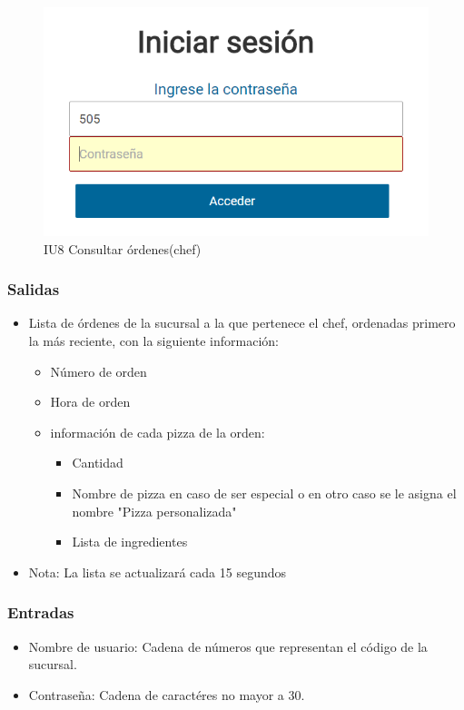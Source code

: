 \documentclass[oneside,10pt]{book}
\begin{document}
\begin{figure}[htbp!]
	\centering
	\includegraphics[width=1\textwidth]{img/iniciar_sesion2c}
	\caption{IU8 Consultar órdenes(chef)}
\end{figure}


\subsubsection{Salidas}
\begin{itemize} 
	\item Lista de órdenes de la sucursal a la que pertenece el chef, ordenadas primero la más reciente, con la siguiente información:
	\begin{itemize}
		\item Número de orden
		\item Hora de orden
		\item información de cada pizza de la orden:
		\begin{itemize}
			\item Cantidad
			\item Nombre de pizza en caso de ser especial o en otro caso se le asigna el nombre "Pizza personalizada"
			\item Lista de ingredientes
		\end{itemize}
	\end{itemize}
	\item Nota: La lista se actualizará cada 15 segundos
\end{itemize}
\subsubsection{Entradas}
\begin{itemize}
	\item Nombre de usuario: Cadena de números que representan el código de la sucursal. 
	\item Contraseña: Cadena de caractéres no mayor a 30.
\end{itemize}
\end{document}
